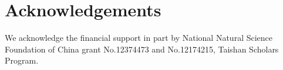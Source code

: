 \documentclass[longbibliography, aps, prx, amsmath, amssymb, amsfonts, twocolumn,superscriptaddress, footinbib]{revtex4-1}
\begin{document}

	\section*{Acknowledgements}
	We acknowledge the financial support in part by National Natural Science Foundation of China grant No.12374473 and No.12174215, Taishan Scholars Program.

	\appendix

\end{document}

